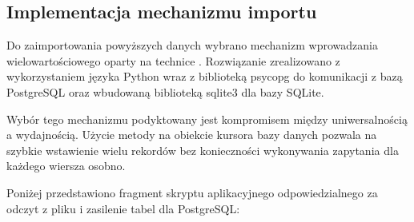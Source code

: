 \documentclass[a4paper,11pt,english,openany,oneside]{sphinxmanual}
\begin{document}
\subsection{Implementacja mechanizmu importu}
\label{\detokenize{rozdzial_4/index:implementacja-mechanizmu-importu}}
\sphinxAtStartPar
Do zaimportowania powyższych danych wybrano mechanizm wprowadzania wielowartościowego oparty na technice . Rozwiązanie zrealizowano z wykorzystaniem języka Python wraz z biblioteką psycopg do komunikacji z bazą PostgreSQL oraz wbudowaną biblioteką sqlite3 dla bazy SQLite.

\sphinxAtStartPar
Wybór tego mechanizmu podyktowany jest kompromisem między uniwersalnością a wydajnością. Użycie metody  na obiekcie kursora bazy danych pozwala na szybkie wstawienie wielu rekordów bez konieczności wykonywania zapytania dla każdego wiersza osobno.

\sphinxAtStartPar
Poniżej przedstawiono fragment skryptu aplikacyjnego odpowiedzialnego za odczyt z pliku i zasilenie tabel dla PostgreSQL:
\end{document}
